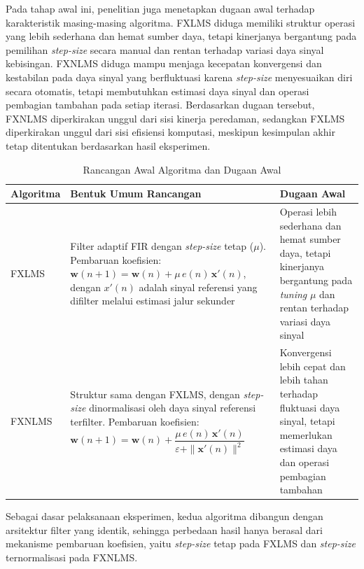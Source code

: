 Pada tahap awal ini, penelitian juga menetapkan dugaan awal terhadap karakteristik masing-masing algoritma. FXLMS diduga memiliki struktur operasi yang lebih sederhana dan hemat sumber daya, tetapi kinerjanya bergantung pada pemilihan \emph{step-size} secara manual dan rentan terhadap variasi daya sinyal kebisingan. FXNLMS diduga mampu menjaga kecepatan konvergensi dan kestabilan pada daya sinyal yang berfluktuasi karena \emph{step-size} menyesuaikan diri secara otomatis, tetapi membutuhkan estimasi daya sinyal dan operasi pembagian tambahan pada setiap iterasi. Berdasarkan dugaan tersebut, FXNLMS diperkirakan unggul dari sisi kinerja peredaman, sedangkan FXLMS diperkirakan unggul dari sisi efisiensi komputasi, meskipun kesimpulan akhir tetap ditentukan berdasarkan hasil eksperimen.

\begin{table}[H]
  \centering
  \caption{Rancangan Awal Algoritma dan Dugaan Awal}
  \label{tab:rancangan_awal}
  \renewcommand{\arraystretch}{1.4}
  \begin{tabular}{|>{\centering\arraybackslash}p{2cm}|>{\raggedright\arraybackslash}p{6.6cm}|>{\raggedright\arraybackslash}p{5.8cm}|}
  \hline
  \textbf{Algoritma} & \textbf{Bentuk Umum Rancangan} & \textbf{Dugaan Awal} \\
  \hline
  FXLMS & Filter adaptif FIR dengan \emph{step-size} tetap ($\mu$). Pembaruan koefisien: $\mathbf{w}(n+1) = \mathbf{w}(n) + \mu\,e(n)\,\mathbf{x}'(n)$, dengan $x'(n)$ adalah sinyal referensi yang difilter melalui estimasi jalur sekunder & Operasi lebih sederhana dan hemat sumber daya, tetapi kinerjanya bergantung pada \emph{tuning} $\mu$ dan rentan terhadap variasi daya sinyal \\
  \hline
  FXNLMS & Struktur sama dengan FXLMS, dengan \emph{step-size} dinormalisasi oleh daya sinyal referensi terfilter. Pembaruan koefisien: $\mathbf{w}(n+1) = \mathbf{w}(n) + \dfrac{\mu\,e(n)\,\mathbf{x}'(n)}{\varepsilon + \|\mathbf{x}'(n)\|^2}$ & Konvergensi lebih cepat dan lebih tahan terhadap fluktuasi daya sinyal, tetapi memerlukan estimasi daya dan operasi pembagian tambahan \\
  \hline
  \end{tabular}
\end{table}

Sebagai dasar pelaksanaan eksperimen, kedua algoritma dibangun dengan arsitektur filter yang identik, sehingga perbedaan hasil hanya berasal dari mekanisme pembaruan koefisien, yaitu \emph{step-size} tetap pada FXLMS dan \emph{step-size} ternormalisasi pada FXNLMS.

